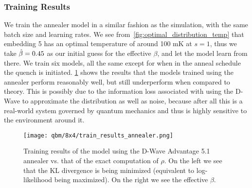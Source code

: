 \subsubsection{Training Results}
We train the annealer model in a similar fashion as the simulation, with the same batch size and learning rates.
We see from~\cref{fig:optimal_distribution_temp} that embedding 5 has an optimal temperature of around 100 \si{\milli\kelvin} at \( s = 1 \), thus we take \( \hat{\beta} = 0.45 \) as our initial guess for the effective \( \beta \), and let the model learn from there.
We train six models, all the same except for when in the anneal schedule the quench is initiated.
\cref{fig:train_results_annealer} shows the results that the models trained using the annealer perform reasonably well, but still underperform when compared to theory.
This is possibly due to the information loss associated with using the D-Wave to approximate the distribution as well as noise, because after all this is a real-world system governed by quantum mechanics and thus is highly sensitive to the environment around it.
\begin{figure}[!htb]
    \begin{center}
        \texttt{[image: qbm/8x4/train\_results\_annealer.png]}
    \end{center}
    \caption{Training results of the model using the D-Wave Advantage 5.1 annealer vs. that of the exact computation of \( \rho \). On the left we see that the KL divergence is being minimized (equivalent to log-likelihood being maximized). On the right we see the effective \( \beta \).}
    \label{fig:train_results_annealer}
\end{figure}

